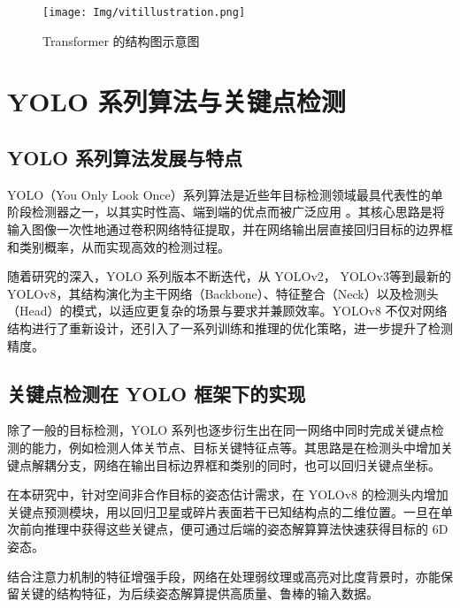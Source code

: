 \begin{figure}[!htb]
	\centering
	\texttt{[image: Img/vitillustration.png]}
	\caption{Transformer 的结构图示意图}
	\label{fig:transformer_arch}
\end{figure}


\section{YOLO 系列算法与关键点检测}
\label{sec:yolo_keypoint}

\subsection{YOLO 系列算法发展与特点}
YOLO（You Only Look Once）系列算法是近些年目标检测领域最具代表性的单阶段检测器之一，以其实时性高、端到端的优点而被广泛应用 \cite{yolo2016you,yolov3}。其核心思路是将输入图像一次性地通过卷积网络特征提取，并在网络输出层直接回归目标的边界框和类别概率，从而实现高效的检测过程。

随着研究的深入，YOLO 系列版本不断迭代，从 YOLOv2\cite{yolov2}， YOLOv3\cite{yolov3}等到最新的 YOLOv8\cite{yolov8_ultralytics}，其结构演化为主干网络（Backbone）、特征整合（Neck）以及检测头（Head）的模式，以适应更复杂的场景与要求并兼顾效率。YOLOv8 不仅对网络结构进行了重新设计，还引入了一系列训练和推理的优化策略，进一步提升了检测精度。

\subsection{关键点检测在 YOLO 框架下的实现}
除了一般的目标检测，YOLO 系列也逐步衍生出在同一网络中同时完成关键点检测的能力，例如检测人体关节点、目标关键特征点等。其思路是在检测头中增加关键点解耦分支，网络在输出目标边界框和类别的同时，也可以回归关键点坐标。

在本研究中，针对空间非合作目标的姿态估计需求，在 YOLOv8 的检测头内增加关键点预测模块，用以回归卫星或碎片表面若干已知结构点的二维位置。一旦在单次前向推理中获得这些关键点，便可通过后端的姿态解算算法快速获得目标的 6D 姿态。

结合注意力机制的特征增强手段，网络在处理弱纹理或高亮对比度背景时，亦能保留关键的结构特征，为后续姿态解算提供高质量、鲁棒的输入数据。
